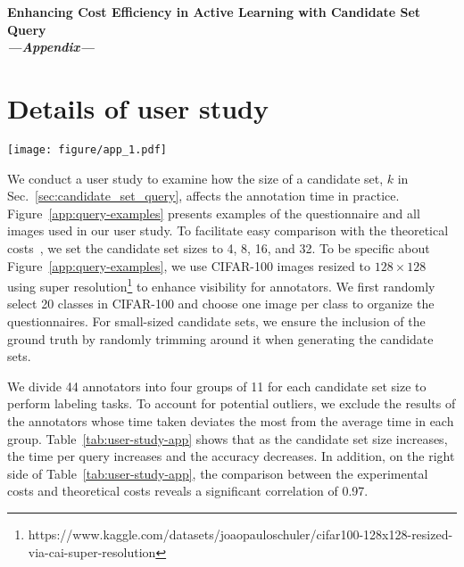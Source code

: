 
\setcounter{section}{0}
\renewcommand\thesection{\Alph{section}}
\renewcommand*{\theHsection}{\thesection}

\begin{center}
    {\Large \textbf{Enhancing Cost Efficiency in Active Learning with Candidate Set Query\\
    \vspace{0.5cm}
    {\it  ---Appendix--- }}}\\
    \vspace{0.5cm}
\end{center}

\section{Details of user study}
\label{app:user-study}

\begin{figure*}[!h]
\centering
\texttt{[image: figure/app\_1.pdf]}
\vspace{-0.5cm}
\caption{Questionnaire and examples used in the user study.
(a) Each question contains an instruction, an image, and a set of candidates. In this case, the candidate set size is 4.
(b) We utilize 20 images in CIFAR-100, each with a resolution of 128 x 128 pixels.}
\label{app:query-examples}
\end{figure*}

We conduct a user study to examine how the size of a candidate set, $k$ in Sec.~\ref{sec:candidate_set_query}, affects the annotation time in practice.
Figure~\ref{app:query-examples} presents examples of the questionnaire and all images used in our user study.
To facilitate easy comparison with the theoretical costs~\citep{hu2018squeeze}, we set the candidate set sizes to 4, 8, 16, and 32.
To be specific about Figure~\ref{app:query-examples}, 
we use CIFAR-100 images resized to $128 \times 128$ using super resolution\footnote{https://www.kaggle.com/datasets/joaopauloschuler/cifar100-128x128-resized-via-cai-super-resolution} to enhance visibility for annotators.
We first randomly select 20 classes in CIFAR-100 and choose one image per class to organize the questionnaires.
For small-sized candidate sets, we ensure the inclusion of the ground truth by randomly trimming around it when generating the candidate sets.

We divide 44 annotators into four groups of 11 for each candidate set size to perform labeling tasks.
To account for potential outliers, we exclude the results of the annotators whose time taken deviates the most from the average time in each group.
Table~\ref{tab:user-study-app} shows that as the candidate set size increases, the time per query increases and the accuracy decreases. In addition, on the right side of Table~\ref{tab:user-study-app}, the comparison between the experimental costs and theoretical costs reveals a significant correlation of 0.97.


